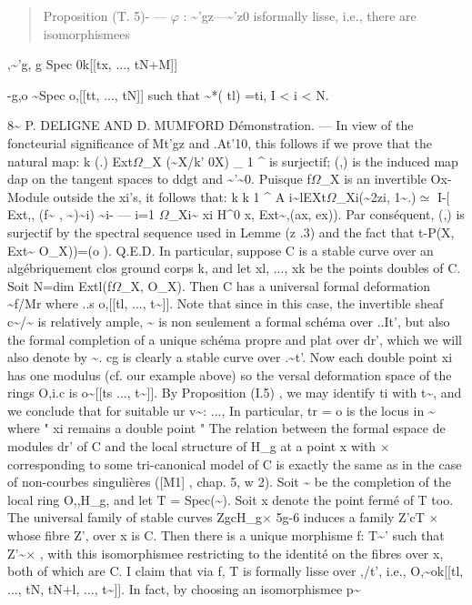 \documentclass[11pt]{article}
\theoremstyle{plain}
\theoremstyle{definition}
\theoremstyle{remark}
\begin{document}
\begin{quote}Proposition (T. 5)- --- $\varphi$ : \textasciitilde{}'gz---\textasciitilde{}'z0 isformally lisse, i.e., there are isomorphismees\end{quote}
,\textasciitilde{}'g, g Spec 0k[[tx, ..., tN+M]]

-g,o \textasciitilde{}Spec o,[[tt, ..., tN]] such that \textasciitilde{}*( tl) =ti, I < i < N.

8\textasciitilde{} P. DELIGNE AND D. MUMFORD D\'emonstration. --- In view of the foncteurial significance of Mt'gz and .At'10, this follows if we prove that the natural map: k (.) Ext$\Omega$\_X (\textasciitilde{}X/k' 0X) \_ 1 \textasciicircum{} is surjectif; (,) is the induced map dap on the tangent spaces to ddgt and \textasciitilde{}'\textasciitilde{}0. Puisque f$\Omega$\_X is an invertible Ox-Module outside the xi's, it follows that: k k 1 \textasciicircum{} A i\textasciitilde{}lEXt$\Omega$\_Xi(\textasciitilde{}2zi, 1\textasciitilde{}.)$\simeq$ I-[ Ext,, (f\textasciitilde{} , \textasciitilde{})\textasciitilde{}i) \textasciitilde{}i- --- i=1 $\Omega$\_Xi\textasciitilde{} xi H\textasciicircum{}0 x, Ext\textasciitilde{},(ax, ex)). Par cons\'equent, (,) is surjectif by the spectral sequence used in Lemme (z .3) and the fact that t-P(X, Ext\textasciitilde{} O\_X))=(o ). Q.E.D. In particular, suppose C is a stable curve over an alg\'ebriquement clos ground corps k, and let xl, ..., xk be the points doubles of C. Soit N=dim Extl(f$\Omega$\_X, O\_X). Then C has a universal formal deformation \textasciitilde{}f/Mr where ..s o,[[tl, ..., t\textasciitilde{}]]. Note that since in this case, the invertible sheaf c\textasciitilde{}/\textasciitilde{} is relatively ample, \textasciitilde{} is non seulement a formal sch\'ema over ..It', but also the formal completion of a unique sch\'ema propre and plat over dr', which we will also denote by \textasciitilde{}. cg is clearly a stable curve over .\textasciitilde{}t'. Now each double point xi has one modulus (cf. our example above) so the versal deformation space of the rings O,i.c is o\textasciitilde{}[[ts ..., t\textasciitilde{}]]. By Proposition (I.5) , we may identify ti with t\textasciitilde{}, and we conclude that for suitable ur v\textasciitilde{}: ..., In particular, tr = o is the locus in \textasciitilde{} where " xi remains a double point " The relation between the formal espace de modules dr' of C and the local structure of H\_g at a point x with $\times$ corresponding to some tri-canonical model of C is exactly the same as in the case of non-courbes singuli\`eres ([M1] , chap. 5, w 2). Soit \textasciitilde{} be the completion of the local ring O,,H\_g, and let T = Spec(\textasciitilde{}). Soit x denote the point ferm\'e of T too. The universal family of stable curves ZgcH\_g$\times$ 5g-6 induces a family Z'cT $\times$ whose fibre Z', over x is C. Then there is a unique morphisme f: T\textasciitilde{}' such that Z'\textasciitilde{}$\times$ , with this isomorphismee restricting to the identit\'e on the fibres over x, both of which are C. I claim that via f, T is formally lisse over ,/t', i.e., O,\textasciitilde{}ok[[tl, ..., tN, tN+l, ..., t\textasciitilde{}]]. In fact, by choosing an isomorphismee p\textasciitilde{} 
\end{document}
